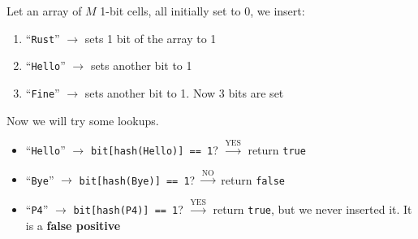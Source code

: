 \begin{examplebox}
    Let an array of $M$ 1-bit cells, all initially set to $0$, we insert:
    \begin{enumerate}
        \item ``\texttt{Rust}'' $\rightarrow$ sets 1 bit of the array to 1
        \item ``\texttt{Hello}'' $\rightarrow$ sets another bit to 1
        \item ``\texttt{Fine}'' $\rightarrow$ sets another bit to 1. Now 3 bits are set
    \end{enumerate}
    Now we will try some lookups.
    \begin{itemize}
        \item ``\texttt{Hello}'' $\rightarrow$ \texttt{bit[hash(Hello)] == 1}? $\xrightarrow{\text{YES}}$  return \texttt{true}
        \item ``\texttt{Bye}'' $\rightarrow$ \texttt{bit[hash(Bye)] == 1}? $\xrightarrow{\text{NO}}$  return \texttt{false}
        \item ``\texttt{P4}'' $\rightarrow$ \texttt{bit[hash(P4)] == 1}? $\xrightarrow{\text{YES}}$  return \texttt{true}, but we never inserted it. It is a \textbf{false positive}
    \end{itemize}
\end{examplebox}

